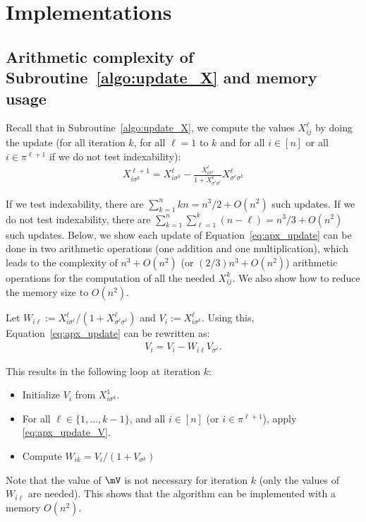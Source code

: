 \section{Implementations}
\label{apx:implementation}

\subsection{Arithmetic complexity of Subroutine~\ref{algo:update_X} and memory usage}

Recall that in Subroutine~\ref{algo:update_X}, we compute the values $X^{\ell}_{ij}$ by doing the update (for all iteration $k$, for all $\ell=1$ to $k$ and for all $i\in[n]$ or all $i\in\pi^{\ell+1}$ if we do not test indexability):
\begin{align}
    \label{eq:apx_update}
    X_{i\sigma^{k}}^{\ell+1} = X_{i\sigma^{k}}^{\ell} -\displaystyle\frac{X^{\ell}_{i\sigma^{\ell}}}{1+X^{\ell}_{\sigma^{\ell}\sigma^{\ell}}}X^{\ell}_{\sigma^{\ell}\sigma^{k}}
\end{align}

If we test indexability, there are $\sum_{k=1}^nk n = n^3/2+O(n^2)$ such updates. If we do not test indexability, there are $\sum_{k=1}^n \sum_{\ell=1}^k (n-\ell) = n^3/3 + O(n^2)$ such updates.  Below, we show each update of Equation~\eqref{eq:apx_update} can be done in two arithmetic operations (one addition and one multiplication), which leads to the complexity of $n^3+O(n^2)$ (or $(2/3)n^3+O(n^2)$) arithmetic operations for the computation of all the needed $X^k_{ij}$.  We also show how to reduce the memory size to $O(n^2)$.

Let $W_{i\ell} := X^\ell_{i \sigma^\ell}/(1+X^\ell_{\sigma^\ell\sigma^\ell})$ and $V_i :=X^\ell_{i\sigma^k}$. Using this, Equation~\eqref{eq:apx_update} can be rewritten as: 
\begin{align}
    \label{eq:apx_update_V}
    V_{i} = V_{i} - W_{i\ell} V_{\sigma^{\ell}}.
\end{align}

This results in the following loop at iteration $k$:
\begin{itemize}
    \item Initialize $V_{i}$ from $X^1_{i\sigma^k}$. 
    \item For all $\ell\in\{1,\dots, k-1\}$, and all $i\in[n]$ (or $i\in\pi^{\ell+1}$), apply \eqref{eq:apx_update_V}. 
    \item Compute $W_{ik}= V_{i}/(1+V_{\sigma^k})$
\end{itemize}
Note that the value of $\mV$ is not necessary for iteration $k$ (only the values of $W_{i\ell}$ are needed). This shows that the algorithm can be implemented with a memory $O(n^2)$.%

